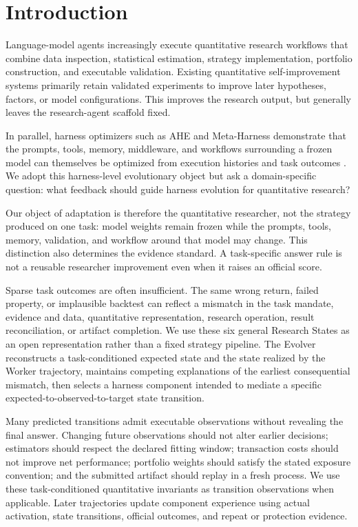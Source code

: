 \section{Introduction}

Language-model agents increasingly execute quantitative research workflows that
combine data inspection, statistical estimation, strategy implementation,
portfolio construction, and executable validation. Existing quantitative
self-improvement systems primarily retain validated experiments to improve later
hypotheses, factors, or model configurations. This improves the research output,
but generally leaves the research-agent scaffold fixed.

In parallel, harness optimizers such as AHE and Meta-Harness demonstrate that
the prompts, tools, memory, middleware, and workflows surrounding a frozen model
can themselves be optimized from execution histories and task outcomes
\citep{lin2026ahe,lee2026metaharness}. We adopt this harness-level evolutionary
object but ask a domain-specific question: what feedback should guide harness
evolution for quantitative research?

Our object of adaptation is therefore the quantitative researcher, not the
strategy produced on one task: model weights remain frozen while the prompts,
tools, memory, validation, and workflow around that model may change. This
distinction also determines the evidence standard. A task-specific answer rule
is not a reusable researcher improvement even when it raises an official score.

Sparse task outcomes are often insufficient. The same wrong return, failed
property, or implausible backtest can reflect a mismatch in the task mandate,
evidence and data, quantitative representation, research operation, result
reconciliation, or artifact completion. We use these six general Research
States as an open representation rather than a fixed strategy pipeline. The
Evolver reconstructs a task-conditioned expected state and the state realized
by the Worker trajectory, maintains competing explanations of the earliest
consequential mismatch, then selects a harness component intended to mediate a
specific expected-to-observed-to-target state transition.

Many predicted transitions admit executable observations without revealing the
final answer. Changing future observations should not alter earlier decisions;
estimators should respect the declared fitting window; transaction costs should
not improve net performance; portfolio weights should satisfy the stated
exposure convention; and the submitted artifact should replay in a fresh
process. We use these task-conditioned quantitative invariants as transition
observations when applicable. Later trajectories update component experience
using actual activation, state transitions, official outcomes, and repeat or
protection evidence.

